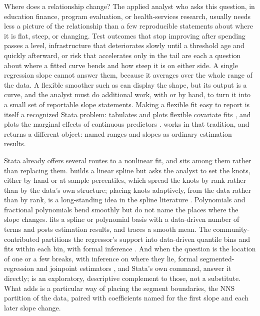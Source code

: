 Where does a relationship change?  The applied analyst who asks this
question, in education finance, program evaluation, or health-services
research, usually needs less a picture of the relationship than a few
reproducible statements about where it is flat, steep, or changing.  Test
outcomes that stop improving after spending passes a level, infrastructure
that deteriorates slowly until a threshold age and quickly afterward, or risk
that accelerates only in the tail are each a question about where a fitted
curve bends and how steep it is on either side.  A single regression slope
cannot answer them, because it averages over the whole range of the data.  A
flexible smoother such as  \citep{stata_2025} can
display the shape, but its output is a curve, and the analyst must do
additional work, with  or by hand, to turn it into a small set
of reportable slope statements.  Making a flexible fit easy to report is
itself a recognized Stata problem:  tabulates and plots flexible
covariate fits \citep{orsini_greenland_2011}, and 
plots the marginal effects of continuous predictors \citep{royston_2013_mcp}.
 works in that tradition, and returns a different object: named
ranges and slopes as ordinary estimation results.

Stata already offers several routes to a nonlinear fit, and 
sits among them rather than replacing them.   builds a linear
spline but asks the analyst to set the knots, either by hand or at sample
percentiles, which spread the knots by rank rather than by the data's own
structure; placing knots adaptively, from the data rather than by rank, is a
long-standing idea in the spline literature \citep{friedman_1991}.
Polynomials and fractional polynomials \citep{royston_altman_1994} bend
smoothly but do not name the places where the slope changes.
 fits a spline or
polynomial basis with a data-driven number of terms and posts estimation
results, and  traces a smooth mean.  The
community-contributed  partitions the regressor's support into
data-driven quantile bins and fits within each bin, with formal inference
\citep{cattaneo_etal_2024_aer,cattaneo_etal_2025_binsreg}.  And when the
question is the location of one or a few breaks, with inference on where they
lie, formal segmented-regression and joinpoint estimators
\citep{muggeo_2003,kim_etal_2000}, and Stata's own  command,
answer it directly;  is an exploratory, descriptive complement
to those, not a substitute.  What 
adds is a particular way of placing the segment boundaries, the NNS partition
of the data, paired with coefficients named for the first slope and each
later slope change.

